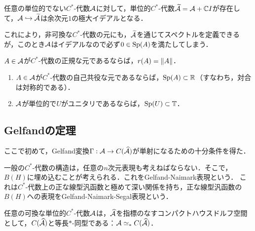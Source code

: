 \documentclass[uplatex,dvipdfmx]{jsreport}
\begin{document}
\begin{lemma}[$C^*$-代数の単位化]
    任意の単位的でない$C^*$-代数$\mathcal{A}$に対して，単位的$C^*$-代数$\widetilde{\mathcal{A}}=\mathcal{A}+\mathbb{C} I$が存在して，$\mathcal{A}\hookrightarrow\widetilde{\mathcal{A}}$は余次元$1$の極大イデアルとなる．
\end{lemma}
\begin{remark}
    これにより，非可換な$C^*$-代数の元にも，$\widetilde{\mathcal{A}}$を通じてスペクトルを定義できるが，このとき$\mathcal{A}$はイデアルなので必ず$0\in\mathrm{Sp}(A)$を満たしてしまう．
\end{remark}

\begin{lemma}[正規な元のスペクトル半径はノルムに等しい]
    $A\in\mathcal{A}$が$C^*$-代数の正規な元であるならば，$r(A)=\|A\|$．
\end{lemma}

\begin{lemma}\mbox{}
    \begin{enumerate}
        \item $A\in\mathcal{A}$が$C^*$-代数の自己共役な元であるならば，$\mathrm{Sp}(A)\subset\mathbb{R}$（すなわち，対合は対称的である）．
        \item $\mathcal{A}$が単位的で$U$がユニタリであるならば，$\mathrm{Sp}(U)\subset\mathbb{T}$．
    \end{enumerate}
\end{lemma}

\subsection{Gelfandの定理}

\begin{tcolorbox}[colframe=ForestGreen, colback=ForestGreen!10!white,breakable,colbacktitle=ForestGreen!40!white,coltitle=black,fonttitle=\bfseries\sffamily,
title=可換な$C^*$代数の構造は1次元表現によって特徴付けられる]
    ここで初めて，Gelfand変換$\Gamma:\mathcal{A}\to C(\widehat{\mathcal{A}})$が単射になるための十分条件を得た．

    一般の$C^*$-代数の構造は，任意の$n$次元表現も考えねばならない．そこで，$B(H)$に埋め込むことが考えられる．これをGelfand-Naimark表現という．
    これは$C^*$-代数上の正な線型汎函数と極めて深い関係を持ち，正な線型汎函数の$B(H)$への表現をGelfand-Naimark-Segal表現という．
\end{tcolorbox}

\begin{theorem}
    任意の可換な単位的$C^*$-代数$\mathcal{A}$は，$\widehat{\mathcal{A}}$を指標のなすコンパクトハウスドルフ空間として，$C(\widehat{\mathcal{A}})$と等長$*$-同型である：$\mathcal{A}\simeq_* C(\widehat{\mathcal{A}})$．
\end{theorem}
\end{document}
